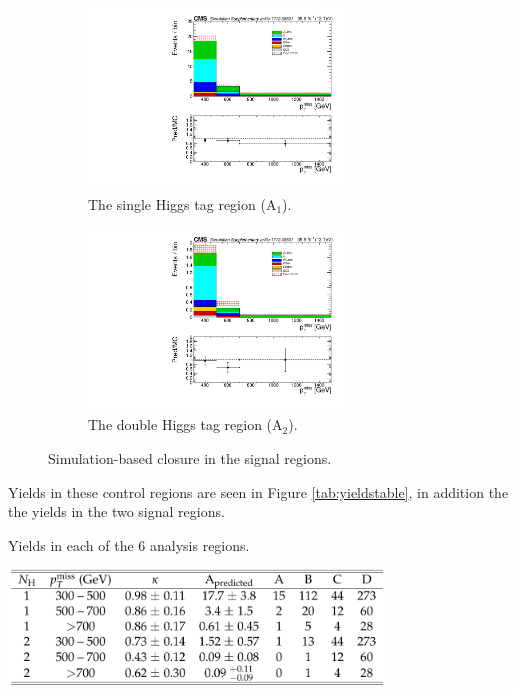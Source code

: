 \begin{figure}[htbp]

\begin{subfigure}[b]{0.5\textwidth}
\centering
\includegraphics[width=0.75\textwidth]{figs/MCclosure_singleHiggsRegionTotal.pdf}
\caption{The single Higgs tag region (A$_{1}$).}
\end{subfigure}

\begin{subfigure}[b]{0.5\textwidth}
\centering
\includegraphics[width=0.75\textwidth]{figs/MCclosure_doubleHiggsRegionTotal.pdf}
\caption{The double Higgs tag region (A$_{2}$).}
\end{subfigure}

\caption{Simulation-based closure in the signal regions.}
\label{fig:mcclosure}
\end{figure}

Yields in these control regions are seen in Figure \ref{tab:yieldstable}, in addition the the yields in the two signal regions.

\begin{table}[htbp]
\centering
\caption{Yields in each of the 6 analysis regions.}
\includegraphics[width=0.75\textwidth]{figs/CMS-SUS-17-006_Table-aux_001.pdf}
\label{tab:yieldstable}
\end{table}

